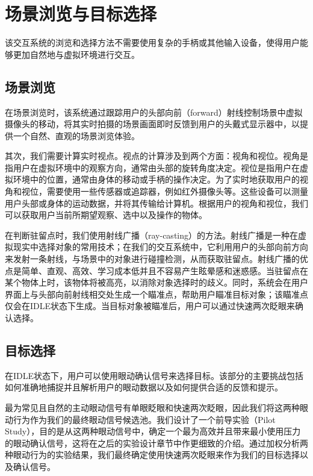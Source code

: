 \section{场景浏览与目标选择}

该交互系统的浏览和选择方法不需要使用复杂的手柄或其他输入设备，使得用户能够更加自然地与虚拟环境进行交互。

\subsection{场景浏览}

在场景浏览时，该系统通过跟踪用户的头部向前（forward）射线控制场景中虚拟摄像头的移动，将其实时拍摄的场景画面即时反馈到用户的头戴式显示器中，以提供一个自然、直观的场景浏览体验。

其次，我们需要计算实时视点。视点的计算涉及到两个方面：视角和视位。视角是指用户在虚拟环境中的观察方向，通常由头部的旋转角度决定。视位是指用户在虚拟环境中的位置，通常由身体的移动或手柄的操作决定。为了实时地获取用户的视角和视位，需要使用一些传感器或追踪器，例如红外摄像头等。这些设备可以测量用户头部或身体的运动数据，并将其传输给计算机。根据用户的视角和视位，我们可以获取用户当前所期望观察、选中以及操作的物体。

在判断驻留点时，我们使用射线广播（ray-casting）的方法。射线广播是一种在虚拟现实中选择对象的常用技术；在我们的交互系统中，它利用用户的头部向前方向来发射一条射线，与场景中的对象进行碰撞检测，从而获取驻留点。射线广播的优点是简单、直观、高效、学习成本低并且不容易产生眩晕感和迷惑感。当驻留点在某个物体上时，该物体将被高亮，以消除对象选择时的歧义。同时，系统会在用户界面上与头部向前射线相交处生成一个瞄准点，帮助用户瞄准目标对象；该瞄准点仅会在IDLE状态下生成。当目标对象被瞄准后，用户可以通过快速两次眨眼来确认选择。

\subsection{目标选择}

在IDLE状态下，用户可以使用眼动确认信号来选择目标。该部分的主要挑战包括如何准确地捕捉并且解析用户的眼动数据以及如何提供合适的反馈和提示。

最为常见且自然的主动眼动信号有单眼眨眼和快速两次眨眼，因此我们将这两种眼动行为作为我们的最终眼动信号候选池。我们设计了一个前导实验（Pilot Study），目的是从这两种眼动信号中，确定一个最为高效并且带来最小使用压力的眼动确认信号，这将在之后的实验设计章节中作更细致的介绍。通过加权分析两种眼动行为的实验结果，我们最终确定使用快速两次眨眼来作为我们的目标选择以及确认信号。

